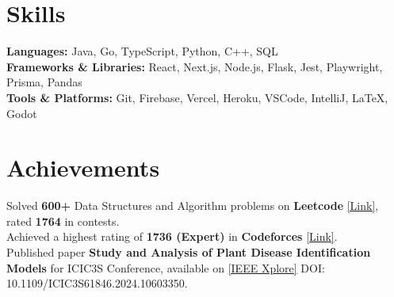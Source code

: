 \documentclass[]{Nikhil_Kadiyan_Resume}
\begin{document}

\section{Skills} 
\hrulefill

\pt \textbf{Languages:} Java, Go, TypeScript, Python, C++, SQL \\
\pt \textbf{Frameworks \& Libraries:} React, Next.js, Node.js, Flask, Jest, Playwright, Prisma, Pandas \\
\pt \textbf{Tools \& Platforms:} Git, Firebase, Vercel, Heroku, VSCode, IntelliJ, LaTeX, Godot \\

\sectionsep

\section{Achievements} 
\hrulefill

\pt Solved \textbf{600+} Data Structures and Algorithm problems on \textbf{Leetcode} \href{https://leetcode.com/thisidusedbysomeone/}{[Link]}, rated \textbf{1764} in contests.\\ 
\pt Achieved a highest rating of \textbf{1736 (Expert)} in \textbf{Codeforces} \href{https://codeforces.com/profile/akatsumanoka}{[Link]}.\\
\pt Published paper \textbf{Study and Analysis of Plant Disease Identification Models} for ICIC3S Conference, available on \href{https://ieeexplore.ieee.org/document/10603350}{[IEEE Xplore]} DOI: 10.1109/ICIC3S61846.2024.10603350.\\

\sectionsep
\end{document}
